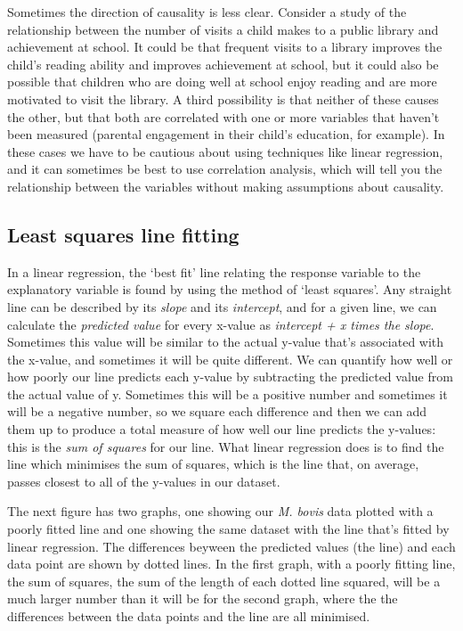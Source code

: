 \documentclass[
]{book}
\begin{document}
Sometimes the direction of causality is less clear. Consider a study of the relationship between the number of visits a child makes to a public library and achievement at school. It could be that frequent visits to a library improves the child's reading ability and improves achievement at school, but it could also be possible that children who are doing well at school enjoy reading and are more motivated to visit the library. A third possibility is that neither of these causes the other, but that both are correlated with one or more variables that haven't been measured (parental engagement in their child's education, for example). In these cases we have to be cautious about using techniques like linear regression, and it can sometimes be best to use correlation analysis, which will tell you the relationship between the variables without making assumptions about causality.

\hypertarget{least-squares-line-fitting}{%
\subsection{Least squares line fitting}\label{least-squares-line-fitting}}

In a linear regression, the `best fit' line relating the response variable to the explanatory variable is found by using the method of `least squares'. Any straight line can be described by its \emph{slope} and its \emph{intercept}, and for a given line, we can calculate the \emph{predicted value} for every x-value as \emph{intercept + x times the slope}. Sometimes this value will be similar to the actual y-value that's associated with the x-value, and sometimes it will be quite different. We can quantify how well or how poorly our line predicts each y-value by subtracting the predicted value from the actual value of y. Sometimes this will be a positive number and sometimes it will be a negative number, so we square each difference and then we can add them up to produce a total measure of how well our line predicts the y-values: this is the \emph{sum of squares} for our line. What linear regression does is to find the line which minimises the sum of squares, which is the line that, on average, passes closest to all of the y-values in our dataset.

The next figure has two graphs, one showing our \emph{M. bovis} data plotted with a poorly fitted line and one showing the same dataset with the line that's fitted by linear regression. The differences beyween the predicted values (the line) and each data point are shown by dotted lines. In the first graph, with a poorly fitting line, the sum of squares, the sum of the length of each dotted line squared, will be a much larger number than it will be for the second graph, where the the differences between the data points and the line are all minimised.
\end{document}
